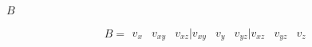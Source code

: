 \documentclass{article}
\begin{document}
$B$
\pagebreak

\[ B=\begin{matrix} v_x & v_{xy} & v_{xz} | v_{xy} & v_y & v_{yz} | v_{xz} & v_{yz} & v_z \end{matrix} \]
\pagebreak
\end{document}
